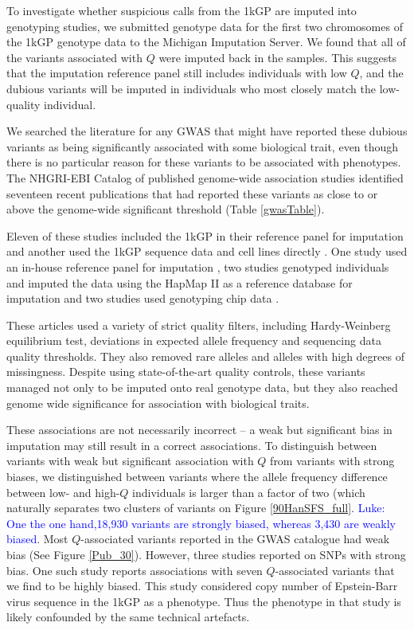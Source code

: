 \documentclass[9pt,lineno]{elife}
\newcommand{\luke}[1]{\textcolor{blue}{Luke: #1}}
\begin{document}
To investigate whether suspicious calls from the 1kGP are imputed into genotyping studies, we submitted genotype data for the first two chromosomes of the 1kGP genotype data to the Michigan Imputation Server.
We found that all of the variants associated with $Q$ were imputed back in the samples.
This suggests that the imputation reference panel still includes individuals with low $Q$, and the dubious variants will be imputed in individuals who most closely match the low-quality individual.

We searched the literature for any GWAS that might have reported these dubious variants as being significantly associated with some biological trait, even though there is no particular reason for these variants to be associated with phenotypes.
The NHGRI-EBI Catalog of published genome-wide association studies identified seventeen recent publications that had reported these variants as close to or above the genome-wide significant threshold (Table \ref{gwasTable}).

Eleven of these studies included the 1kGP in their reference panel for imputation \citep{xu2012genome, lutz2015genome, park2015mercapturic, astle2016allelic, herold2016family,  suhre2017connecting, lopez2017genome, tian2017genome,  spracklen2017association,  nagy2017exploration, gao2018genome} and another used the 1kGP sequence data and cell lines directly \citep{Mandage2017}.
One study used an in-house reference panel for imputation \citep{nishida2018key}, two studies genotyped individuals and imputed the data using the HapMap II as a reference  database for imputation \citep{Kraja2011, Ebejer2013} and two studies used genotyping chip data \citep{yucesoy2015genome, ellinghaus2016analysis}.

These articles used a variety of strict quality filters, including Hardy-Weinberg equilibrium test, deviations in expected allele frequency and sequencing data quality thresholds.
They also removed rare alleles and alleles with high degrees of missingness.
Despite using state-of-the-art quality controls, these variants managed not only to be imputed onto real genotype data, but they also reached genome wide significance for association with biological traits.

These associations are not necessarily incorrect -- a weak but significant bias in imputation may still result in a correct associations. 
To distinguish between variants with weak but significant association with $Q$ from variants with strong biases, we distinguished between variants where the allele frequency difference between low- and high-$Q$ individuals is larger than a factor of two (which naturally separates two clusters of variants on Figure \ref{90HanSFS_full}. \luke{One the one hand,18,930 variants are strongly biased, whereas 3,430 are weakly biased}. Most $Q$-associated variants reported in the GWAS catalogue had weak bias (See Figure \ref{Pub_30}).
However, three studies reported on SNPs with strong bias. One such study reports associations with seven $Q$-associated variants that we find to be highly biased. This study considered copy number of Epstein-Barr virus sequence in the 1kGP as a phenotype. Thus the phenotype in that study is likely confounded by the same technical artefacts.
\end{document}
